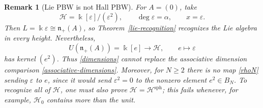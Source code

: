 \documentclass[11pt]{article}
\newtheorem{remark}[theorem]{Remark}
\newcommand{\kk}{\Bbbk}
\begin{document}
\begin{remark}[Lie PBW is not Hall PBW]
For $A=(0)$, take
\[
 \mathcal H=\kk[\varepsilon]/(\varepsilon^2),\qquad
 \deg\varepsilon=\alpha,\qquad x=\varepsilon.
\]
Then $L=\kk\varepsilon\cong\mathfrak n_+(A)$, so
Theorem~\ref{lie-recognition} recognizes the Lie algebra in every height.
Nevertheless,
\[
 U(\mathfrak n_+(A))=\kk[e]\longrightarrow\mathcal H,\qquad
 e\longmapsto\varepsilon
\]
has kernel $(e^2)$.  Thus \eqref{dimensions} cannot replace the
associative dimension comparison \eqref{associative-dimensions}.  Moreover,
for $N\geq2$ there is no map \eqref{rhoN} sending $\varepsilon$ to $e$,
since it would send $\varepsilon^2=0$ to the nonzero element $e^2\in B_N$.
To recognize all of $\mathcal H$, one must also prove
$\mathcal H=\mathcal H^{\mathrm{sph}}$; this fails whenever, for example,
$\mathcal H_0$ contains more than the unit.
\end{remark}
\end{document}
